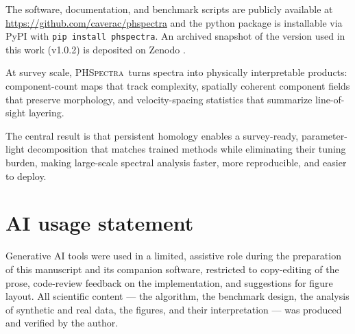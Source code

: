 \documentclass[twocolumn,twocolappendix,aj]{aastex631}
\newcommand{\phspectra}{\textsc{PHSpectra}}
\begin{document}
The software, documentation, and benchmark scripts are publicly available at
\url{https://github.com/caverac/phspectra} and the python package is
installable via PyPI with \texttt{pip install phspectra}.  An archived
snapshot of the version used in this work (v1.0.2) is deposited on Zenodo
\citep{PHSpectra2026}.

At survey scale, \phspectra\ turns spectra into physically interpretable
products: component-count maps that track complexity, spatially coherent
component fields that preserve morphology, and velocity-spacing statistics
that summarize line-of-sight layering.

The central result is that persistent homology enables a survey-ready,
parameter-light decomposition that matches trained methods while eliminating
their tuning burden, making large-scale spectral analysis faster, more
reproducible, and easier to deploy.

\section*{AI usage statement}\label{sec:ai_usage}

Generative AI tools were used in a limited, assistive role during the
preparation of this manuscript and its companion software, restricted to
copy-editing of the prose, code-review feedback on the implementation,
and suggestions for figure layout.  All scientific content --- the
algorithm, the benchmark design, the analysis of synthetic and real
data, the figures, and their interpretation --- was produced and
verified by the author.



\end{document}

